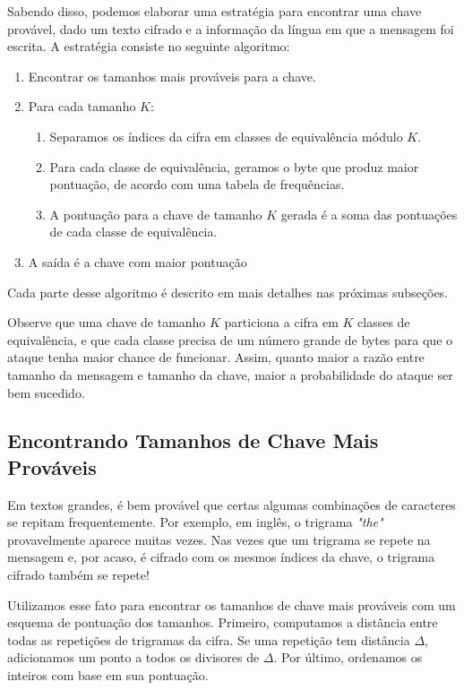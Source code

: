 \documentclass[conference]{IEEEtran}
\begin{document}
Sabendo disso, podemos elaborar uma estratégia para encontrar uma chave
provável, dado um texto cifrado e a informação da língua em que a mensagem foi
escrita. A estratégia consiste no seguinte algoritmo:

\begin{enumerate}
    \item Encontrar os tamanhos mais prováveis para a chave.
    \item Para cada tamanho $K$:
        \begin{enumerate}
            \item Separamos os índices da cifra em classes de equivalência
                módulo $K$.
            \item Para cada classe de equivalência, geramos o byte que produz
                maior pontuação, de acordo com uma tabela de frequências. 
            \item A pontuação para a chave de tamanho $K$ gerada é a soma das
                pontuações de cada classe de equivalência.
        \end{enumerate}
    \item A saída é a chave com maior pontuação
\end{enumerate}

Cada parte desse algoritmo é descrito em mais detalhes nas próximas subseções.  

Observe que uma chave de tamanho $K$ particiona a cifra em $K$ classes de
equivalência, e que cada classe precisa de um número grande de bytes para que o
ataque tenha maior chance de funcionar. Assim, quanto maior a razão entre
tamanho da mensagem e tamanho da chave, maior a probabilidade do ataque ser bem
sucedido.

\subsection{Encontrando Tamanhos de Chave Mais Prováveis}
\label{sec:tamanhos}

Em textos grandes, é bem provável que certas algumas combinações de caracteres
se repitam frequentemente. Por exemplo, em inglês, o trigrama \textit{"the"}
provavelmente aparece muitas vezes. Nas vezes que um trigrama se repete na
mensagem e, por acaso, é cifrado com os mesmos índices da chave, o trigrama
cifrado também se repete!

Utilizamos esse fato para encontrar os tamanhos de chave mais prováveis com um
esquema de pontuação dos tamanhos. Primeiro, computamos a distância entre todas
as repetições de trigramas da cifra. Se uma repetição tem distância $\Delta $,
adicionamos um ponto a todos os divisores de $\Delta $. Por último, ordenamos os
inteiros com base em sua pontuação.
\end{document}
